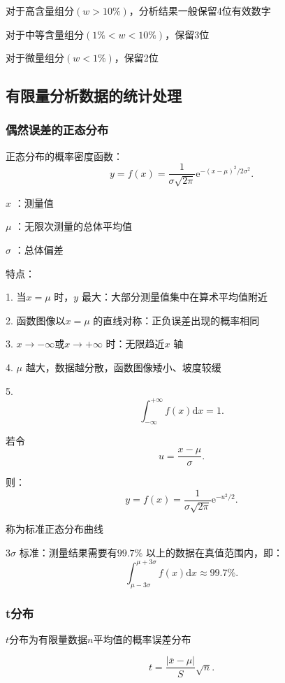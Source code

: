 \begin{notation}
    对于高含量组分$\left( w>10\% \right) $，分析结果一般保留4位有效数字

    对于中等含量组分$\left( 1\%<w<10\% \right) $，保留3位

    对于微量组分$\left( w<1\% \right) $，保留2位
\end{notation}

\subsection{有限量分析数据的统计处理}%
\label{sub:有限量分析数据的统计处理}
\subsubsection{偶然误差的正态分布}%
\label{subsub:偶然误差的正态分布}
正态分布的概率密度函数：\[
    y=f\left( x \right) =\frac{1}{\sigma \sqrt{2\pi} }\mathrm{e}^{-\left( x-\mu \right) ^{2}/2\sigma^{2}}
.\] 
\begin{notation}
    $x$ ：测量值

    $\mu$ ：无限次测量的总体平均值

    $\sigma$ ：总体偏差
\end{notation}
特点：

1. 当$x=\mu$ 时，$y$ 最大：大部分测量值集中在算术平均值附近

2. 函数图像以$x=\mu$ 的直线对称：正负误差出现的概率相同

3. $x\to -\infty$或$x\to +\infty$ 时：无限趋近$x$ 轴

4. $\mu$ 越大，数据越分散，函数图像矮小、坡度较缓

5. 
\[
    \int_{-\infty}^{+\infty} f\left( x \right) \mathrm{d}x=1
.\] 

\begin{notation}
    若令\[
        u=\frac{x-\mu}{\sigma}
    .\] 

    则：\[
        y=f\left( x \right) =\frac{1}{\sigma\sqrt{2\pi}} \mathrm{e}^{-u^2 / 2}
    .\] 
    
    称为标准正态分布曲线
\end{notation}

\begin{notation}
    $3\sigma$ 标准：测量结果需要有$99.7\%$ 以上的数据在真值范围内，即：
    \[
        \int_{\mu-3\sigma}^{\mu+3\sigma}f\left( x \right) \mathrm{d}x\approx 99.7\%
    .\] 
\end{notation}

\subsubsection{t分布}%
\label{subsub:t分布}
\begin{defi}
    $t$分布为有限量数据$n$平均值的概率误差分布
\end{defi}
\[
    t=\frac{\left| \bar{x}-\mu \right| }{S}\sqrt{n} 
.\] 

